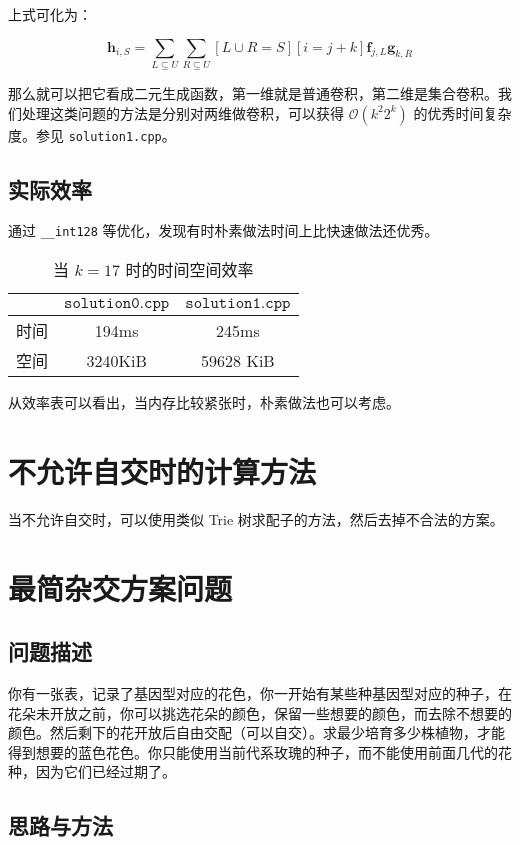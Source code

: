 \documentclass[12pt]{article} %
\begin{document}
上式可化为：

$$\mathbf h_{i,S}=\sum_{L\subseteq U} \sum_{R\subseteq U} [L \cup R=S][i=j+k] \mathbf f_{j,L} \mathbf g_{k,R}$$

那么就可以把它看成二元生成函数，第一维就是普通卷积，第二维是集合卷积。我们处理这类问题的方法是分别对两维做卷积，可以获得 $\mathcal O(k^2 2^k)$ 的优秀时间复杂度。参见 \texttt{solution1.cpp}。

\subsection{实际效率}

通过 \texttt{\_\_int128} 等优化，发现有时朴素做法时间上比快速做法还优秀。

\begin{table}[htbp]
	\centering
	\caption{当 $k=17$ 时的时间空间效率}
	\begin{tabular}{c|c|c}
		& $\texttt{solution0.cpp}$ & $\texttt{solution1.cpp}$\\ \hline
		时间 & 194ms & 245ms \\ \hline
		空间 & 3240KiB & 59628 KiB 
	\end{tabular}
\end{table}

从效率表可以看出，当内存比较紧张时，朴素做法也可以考虑。

\section{不允许自交时的计算方法}

当不允许自交时，可以使用类似 Trie 树求配子的方法，然后去掉不合法的方案。

\section{最简杂交方案问题}

\subsection{问题描述}

你有一张表，记录了基因型对应的花色，你一开始有某些种基因型对应的种子，在花朵未开放之前，你可以挑选花朵的颜色，保留一些想要的颜色，而去除不想要的颜色。然后剩下的花开放后自由交配（可以自交）。求最少培育多少株植物，才能得到想要的蓝色花色。你只能使用当前代系玫瑰的种子，而不能使用前面几代的花种，因为它们已经过期了。

\subsection{思路与方法}
\end{document}
